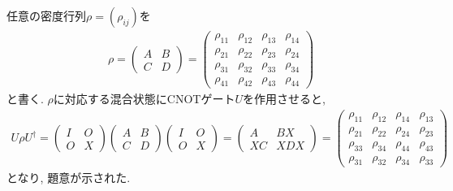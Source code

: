 \begin{ex}
    \label{ex4.19}
    任意の密度行列$\rho = (\rho_{ij})$を
    \begin{align*}
        \rho =
        \begin{pmatrix}
            A & B \\
            C & D
        \end{pmatrix}
        =
        \begin{pmatrix}
            \rho_{11} & \rho_{12} & \rho_{13} & \rho_{14} \\
            \rho_{21} & \rho_{22} & \rho_{23} & \rho_{24} \\
            \rho_{31} & \rho_{32} & \rho_{33} & \rho_{34} \\
            \rho_{41} & \rho_{42} & \rho_{43} & \rho_{44}
        \end{pmatrix}
    \end{align*}
    と書く. $\rho$に対応する混合状態にCNOTゲート$U$を作用させると,
    \begin{align*}
        U \rho U^\dagger
        =
        \begin{pmatrix}
            I & O \\
            O & X
        \end{pmatrix}
        \begin{pmatrix}
            A & B \\
            C & D
        \end{pmatrix}
        \begin{pmatrix}
            I & O \\
            O & X
        \end{pmatrix}
        =
        \begin{pmatrix}
            A  & BX  \\
            XC & XDX
        \end{pmatrix}
        =
        \begin{pmatrix}
            \rho_{11} & \rho_{12} & \rho_{14} & \rho_{13} \\
            \rho_{21} & \rho_{22} & \rho_{24} & \rho_{23} \\
            \rho_{33} & \rho_{34} & \rho_{44} & \rho_{43} \\
            \rho_{31} & \rho_{32} & \rho_{34} & \rho_{33}
        \end{pmatrix}
    \end{align*}
    となり, 題意が示された.
\end{ex}


